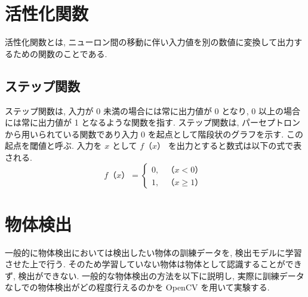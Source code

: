 \section{活性化関数}
活性化関数とは, ニューロン間の移動に伴い入力値を別の数値に変換して出力するための関数のことである.
\subsection{ステップ関数}
ステップ関数は, 入力が 0 未満の場合には常に出力値が 0 となり, 0 以上の場合には常に出力値が 1 となるような関数を指す. ステップ関数は, パーセプトロンから用いられている関数であり入力 0 を起点として階段状のグラフを示す. この起点を閾値と呼ぶ. 入力を $x$ として $f（x）$ を出力とすると数式は以下の式で表される.
\begin{equation}
f（x）= \begin{cases}
0, & （x < 0）\\
1, & （x \geq 1）
\end{cases}
\end{equation}

\section{物体検出}
一般的に物体検出においては検出したい物体の訓練データを, 検出モデルに学習させた上で行う. そのため学習していない物体は物体として認識することができず, 検出ができない. 一般的な物体検出の方法を以下に説明し, 実際に訓練データなしでの物体検出がどの程度行えるのかを OpenCV を用いて実験する. 

